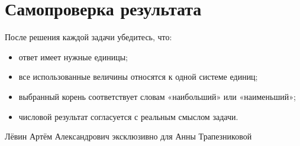 \documentclass[a4paper,11pt]{article}
\begin{document}
\section*{Самопроверка результата}
После решения каждой задачи убедитесь, что:
\begin{itemize}
\item ответ имеет нужные единицы;
\item все использованные величины относятся к одной системе единиц;
\item выбранный корень соответствует словам «наибольший» или «наименьший»;
\item числовой результат согласуется с реальным смыслом задачи.
\end{itemize}
\vfill
\begin{center}
\small\textcolor{pale}{Лёвин Артём Александрович эксклюзивно для Анны Трапезниковой}
\end{center}
\end{document}
